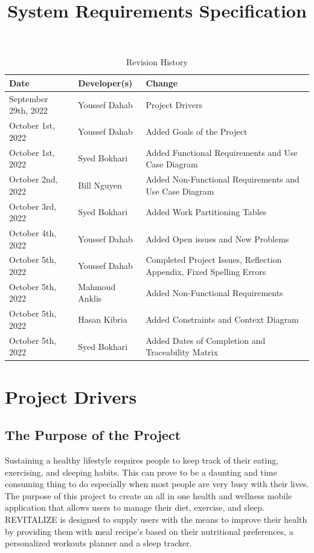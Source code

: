 \documentclass[12pt,letterpaper]{article}
\title{System Requirements Specification\\\progname}
\author{\authname}
\date{}
\begin{document}
\maketitle

\begin{table}[hp]
\caption{Revision History} \label{TblRevisionHistory}
\begin{tabularx}{\textwidth}{llX}
	\toprule
	\textbf{Date} & \textbf{Developer(s)} & \textbf{Change}\\
	\midrule
	September 29th, 2022 & Youssef Dahab & Project Drivers \\
	October 1st, 2022 & Youssef Dahab & Added Goals of the Project \\
	October 1st, 2022 & Syed Bokhari & Added Functional Requirements and Use Case Diagram \\
	October 2nd, 2022 & Bill Nguyen & Added Non-Functional Requirements and Use Case Diagram \\
	October 3rd, 2022 & Syed Bokhari & Added Work Partitioning Tables \\
	October 4th, 2022 & Youssef Dahab & Added Open issues and New Problems \\
	October 5th, 2022 & Youssef Dahab & Completed Project Issues, Reflection Appendix, Fixed Spelling Errors\\
	October 5th, 2022 & Mahmoud Anklis & Added Non-Functional Requirements\\
	October 5th, 2022 & Hasan Kibria & Added Constraints and Context Diagram \\
	October 5th, 2022 & Syed Bokhari & Added Dates of Completion and Traceability Matrix \\
	\bottomrule
\end{tabularx}
\end{table}

\newpage
\tableofcontents
\newpage

\section{Project Drivers}

\subsection{The Purpose of the Project}
Sustaining a healthy lifestyle requires people to keep track of their eating, exercising, and sleeping habits. This can prove to be a daunting and time consuming thing to do especially when most people are very busy with their lives. The purpose of this project to create an all in one health and wellness mobile application that allows users to manage their diet, exercise, and sleep. REVITALIZE is designed to supply users with the means to improve their health by providing them with meal recipe's based on their nutritional preferences, a personalized workouts planner and a sleep tracker. 
\end{document}
